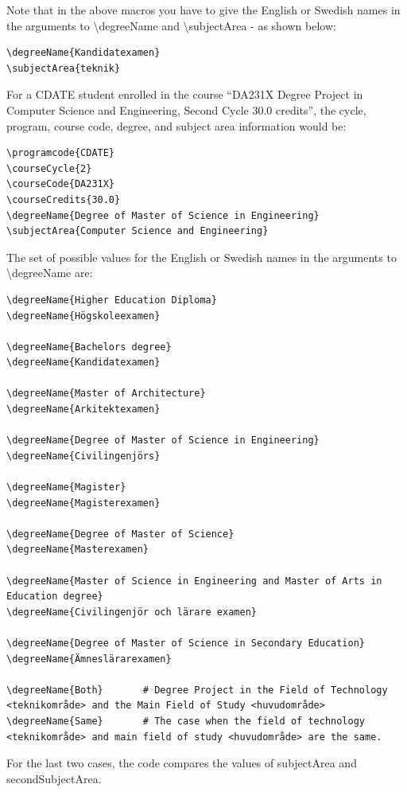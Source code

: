 \documentclass[main.tex]{subfiles}
\begin{document}
Note that in the above macros you have to give the English or Swedish names in the arguments to \textbackslash degreeName and \textbackslash subjectArea - as shown below:
\begin{lstlisting}[style=latexExampleForAuthors]
\degreeName{Kandidatexamen}
\subjectArea{teknik}
\end{lstlisting}

For a CDATE student enrolled in the course ``DA231X Degree Project in Computer Science and Engineering, Second Cycle 30.0 credits'', the cycle, program, course code, degree, and subject area information would be:
\begin{lstlisting}[style=latexExampleForAuthors]
\programcode{CDATE}
\courseCycle{2}
\courseCode{DA231X}
\courseCredits{30.0}
\degreeName{Degree of Master of Science in Engineering}
\subjectArea{Computer Science and Engineering}
\end{lstlisting}

The set of possible values for the English or Swedish names in the arguments to \textbackslash degreeName are:
\begin{lstlisting}[style=latexExampleForAuthors]
\degreeName{Higher Education Diploma}
\degreeName{Högskoleexamen}

\degreeName{Bachelors degree}
\degreeName{Kandidatexamen}

\degreeName{Master of Architecture}
\degreeName{Arkitektexamen}

\degreeName{Degree of Master of Science in Engineering}
\degreeName{Civilingenjörs}

\degreeName{Magister}
\degreeName{Magisterexamen}

\degreeName{Degree of Master of Science}
\degreeName{Masterexamen}

\degreeName{Master of Science in Engineering and Master of Arts in Education degree}
\degreeName{Civilingenjör och lärare examen}

\degreeName{Degree of Master of Science in Secondary Education}
\degreeName{Ämneslärarexamen}

\degreeName{Both}		# Degree Project in the Field of Technology <teknikområde> and the Main Field of Study <huvudområde>
\degreeName{Same}		# The case when the field of technology <teknikområde> and main field of study <huvudområde> are the same.
\end{lstlisting}

For the last two cases, the code compares the values of subjectArea and secondSubjectArea.
\end{document}
